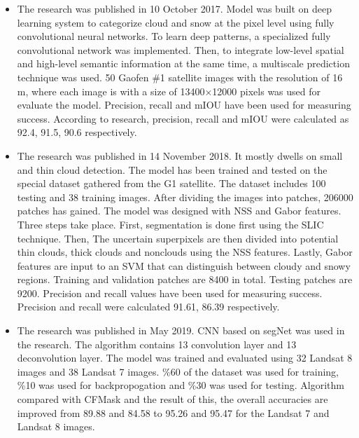 \begin{itemize}
    \item \cite{fifth} The research was published in 10 October 2017. Model was built on deep learning system to categorize cloud and snow at the pixel level using fully convolutional neural networks. To learn deep patterns, a specialized fully convolutional network was implemented. Then, to integrate low-level spatial and high-level semantic information at the same time, a multiscale prediction technique was used.  50 Gaofen \#1 satellite images with the resolution of 16 m, where each image is with a size of 13400×12000 pixels was used for evaluate the model. Precision, recall and mIOU have been used for measuring success. According to research, precision, recall and mIOU were calculated as 92.4, 91.5, 90.6 respectively.

    \item \cite{fourth} The research was published in 14 November 2018. It mostly dwells on small and thin cloud detection. The model has been trained and tested on the special dataset gathered from the G1 satellite. The dataset includes 100 testing and 38 training images. After dividing the images into patches, 206000 patches has gained. The model was designed with NSS and Gabor features. Three steps take place. First, segmentation is done first using the SLIC technique. Then, The uncertain superpixels are then divided into potential  thin clouds, thick clouds and nonclouds using the NSS features. Lastly, Gabor features are input to an SVM that can distinguish between cloudy and snowy regions. Training and validation patches are 8400 in total. Testing patches are 9200. Precision and recall values have been used for measuring success. Precision and recall were calculated 91.61, 86.39 respectively.

    \item \cite{second} The research was published in  May 2019. CNN based on segNet was used in the research. The algorithm contains 13 convolution layer and 13 deconvolution layer. The model was trained and evaluated using 32 Landsat 8 images and 38 Landsat 7 images. \%60 of the dataset was used for training, \%10 was used for backpropogation and \%30 was used for testing. Algorithm compared with CFMask and the result of this, the overall accuracies are improved from 89.88 and 84.58 to 95.26 and 95.47 for the Landsat 7 and Landsat 8 images.


\end{itemize}
